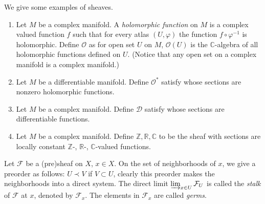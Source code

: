\begin{eg}
    We give some examples of sheaves.
    \begin{enumerate}
        \item Let $M$ be a complex manifold.
        A \emph{holomorphic function} on $M$ is a complex valued function $f$ such that for every atlas $(U,\varphi)$ the function $f\circ\varphi^{-1}$ is holomorphic.
        Define $\mathcal{O}$ as for open set $U$ on $M$, $\mathcal{O}(U)$ is the $\mathbb{C}$-algebra of all holomorphic functions defined on $U$.
        (Notice that any open set on a complex manifold is a complex manifold.)
        \item Let $M$ be a differentiable manifold.
        Define $\mathcal{O}^*$ satisfy whose sections are nonzero holomorphic functions.
        \item Let $M$ be a complex manifold.
        Define $\mathcal{D}$ satisfy whose sections are differentiable functions.
        \item Let $M$ be a complex manifold.
        Define $\mathbb{Z},\mathbb{R},\mathbb{C}$ to be the sheaf with sections are locally constant $\mathbb{Z}$-, $\mathbb{R}$-, $\mathbb{C}$-valued functions.
    \end{enumerate}
\end{eg}

\begin{defn}
    Let $\mathcal{F}$ be a (pre)sheaf on $X$, $x\in X$.
    On the set of neighborhoods of $x$, we give a preorder as follows: $U\prec V$ if $V\subset U$, clearly this preorder makes the neighborhoods into a direct system.
    The direct limit $\varinjlim_{x\in U}\mathcal{F}_U$ is called the \emph{stalk} of $\mathcal{F}$ at $x$, denoted by $\mathcal{F}_x$.
    The elements in $\mathcal{F}_x$ are called \emph{germs}.
\end{defn}


